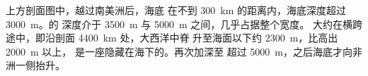 \begin{example}[横跨南大西洋]
上方剖面图中，越过南美洲后，海底
在不到 \qty{300}{km} 的距离内，海底深度超过 \qty{3000}{m}。的
深度介于 \qty{3500}{m} 与 \qty{5000}{m} 之间，几乎占据整个宽度。
大约在横跨途中，即沿剖面 \qty{4400}{km} 处，大西洋中脊
升至海面以下约 \qty{2300}{m}，比高出 \qty{2000}{m} 以上，
是一座隐藏在海下的。再次加深至
超过 \qty{5000}{m}，之后海底才向非洲一侧抬升。
\end{example}

